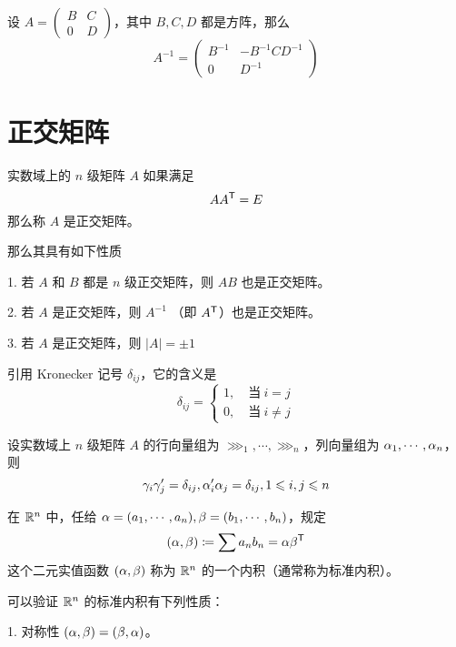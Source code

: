 \begin{theorem}
    设 $A = \left(\begin{matrix} B & C\\ 0 & D \end{matrix}\right)$，其中 $B,C,D$ 都是方阵，那么
    \[A^{-1} = \left(\begin{matrix} B^{-1} & -B^{-1}CD^{-1}\\ 0 & D^{-1} \end{matrix}\right)\]
\end{theorem}

\section{正交矩阵}

\begin{definition}
    实数域上的 $n$ 级矩阵 $A$ 如果满足
    \[A{A}^\mathsf{T}=E\]
    那么称 $A$ 是正交矩阵。
\end{definition}

那么其具有如下性质

1. 若 $A$ 和  $B$ 都是 $n$ 级正交矩阵，则 $AB$ 也是正交矩阵。

2. 若 $A$ 是正交矩阵，则 $A^{-1}$ （即 ${A}^\mathsf{T}$）也是正交矩阵。

3. 若 $A$ 是正交矩阵，则 $|A|=\pm 1$


引用 Kronecker 记号 $\delta_{ij}$，它的含义是
\[\delta_{ij}=\begin{cases}
    1,\quad \text{当}\ i=j\\
    0,\quad \text{当}\ i\ne j
\end{cases}\]

\begin{theorem}
    设实数域上 $n$ 级矩阵 $A$ 的行向量组为 $\ggg_1,\cdots,\ggg_n$，列向量组为 $\alpha_1,\cdots,\alpha_n$，则
    \[\gamma_i\gamma_j'=\delta_{ij},\alpha_i'\alpha_j=\delta_{ij},1 \leqslant i,j \leqslant n\]
\end{theorem}

\begin{definition}
    在 $\mathbb{R}^n$ 中，任给 $\alpha = (a_1,\cdots,a_n),\beta=(b_1,\cdots,b_n)$，规定
    \[(\alpha,\beta) \coloneqq  \sum a_nb_n = \alpha{\beta}^\mathsf{T}\]
    这个二元实值函数 $(\alpha,\beta)$ 称为 $\mathbb{R}^n$ 的一个内积（通常称为标准内积）。
\end{definition}

可以验证 $\mathbb{R}^n$ 的标准内积有下列性质：

1. 对称性 $(\alpha,\beta) = (\beta,\alpha)$。

